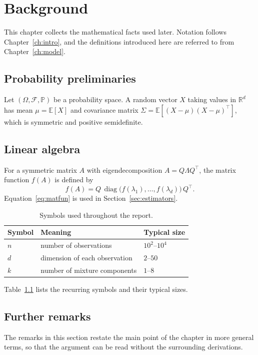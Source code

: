 \chapter{Background}\label{ch:background}

This chapter collects the mathematical facts used later. Notation follows
Chapter~\ref{ch:intro}, and the definitions introduced here are referred to
from Chapter~\ref{ch:model}.

\section{Probability preliminaries}\label{sec:prob}

Let $(\Omega,\mathcal{F},\mathbb{P})$ be a probability space. A random vector
$X$ taking values in $\mathbb{R}^d$ has mean $\mu = \mathbb{E}[X]$ and
covariance matrix $\Sigma = \mathbb{E}[(X-\mu)(X-\mu)^\top]$, which is
symmetric and positive semidefinite.

\lipsum[7-8]

\section{Linear algebra}\label{sec:linalg}

For a symmetric matrix $A$ with eigendecomposition $A = Q\Lambda Q^\top$, the
matrix function $f(A)$ is defined by
\begin{equation}\label{eq:matfun}
  f(A) = Q\,\operatorname{diag}\bigl(f(\lambda_1),\dots,f(\lambda_d)\bigr)\,Q^\top .
\end{equation}
Equation~\eqref{eq:matfun} is used in Section~\ref{sec:estimators}.

\begin{table}[ht]
  \centering
  \begin{tabular}{lll}
    \toprule
    Symbol & Meaning & Typical size \\
    \midrule
    $n$ & number of observations & $10^2$--$10^4$ \\
    $d$ & dimension of each observation & $2$--$50$ \\
    $k$ & number of mixture components & $1$--$8$ \\
    \bottomrule
  \end{tabular}
  \caption{Symbols used throughout the report.}\label{tab:symbols}
\end{table}

Table~\ref{tab:symbols} lists the recurring symbols and their typical sizes.

\lipsum[9-10]

\section{Further remarks}\label{sec:further-background}

The remarks in this section restate the main point of the chapter in more
general terms, so that the argument can be read without the surrounding
derivations.

\lipsum[63-74]
